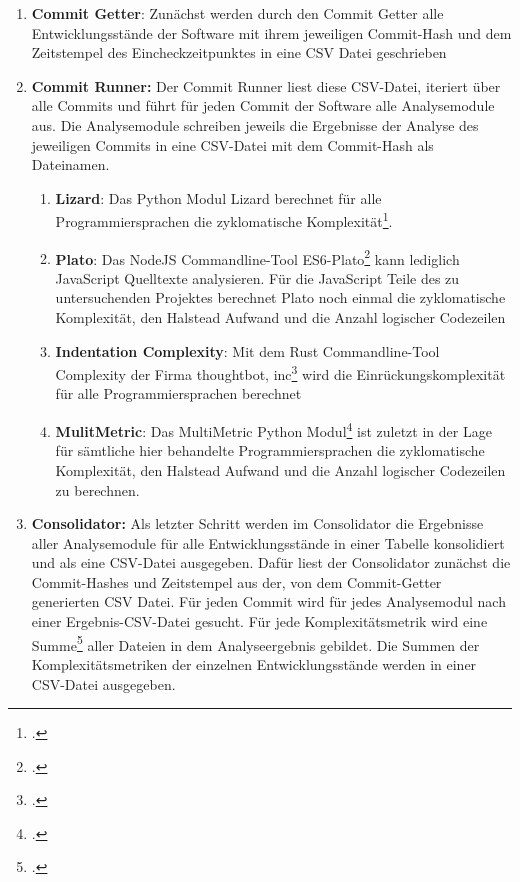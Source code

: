\begin{enumerate}
\def\labelenumi{\arabic{enumi}.}
\item
    \textbf{Commit Getter}: Zunächst werden durch den Commit Getter alle
    Entwicklungsstände der Software mit ihrem jeweiligen Commit-Hash und
    dem Zeitstempel des Eincheckzeitpunktes in eine CSV Datei geschrieben
\item
    \textbf{Commit Runner:} Der Commit Runner liest diese CSV-Datei,
    iteriert über alle Commits und führt für jeden Commit der Software
    alle Analysemodule aus. Die Analysemodule schreiben jeweils die
    Ergebnisse der Analyse des jeweiligen Commits in eine CSV-Datei mit
    dem Commit-Hash als Dateinamen.

    \begin{enumerate}
    \def\labelenumii{\alph{enumii}.}
    \item
    \textbf{Lizard}: Das Python Modul Lizard berechnet für alle
    Programmiersprachen die zyklomatische Komplexität\footcite[Vgl. ][]{LizardPythonModule}.
    \item
    \textbf{Plato}: Das NodeJS Commandline-Tool ES6-Plato\footcite[Vgl. ][]{Es6platoLibMaster}
    kann lediglich JavaScript Quelltexte analysieren. Für die JavaScript
    Teile des zu untersuchenden Projektes berechnet Plato noch einmal
    die zyklomatische Komplexität, den Halstead Aufwand und die Anzahl
    logischer Codezeilen
    \item
    \textbf{Indentation Complexity}: Mit dem Rust Commandline-Tool
    Complexity der Firma thoughtbot, inc\footcite[Vgl. ][]{Complexity2022} wird
    die Einrückungskomplexität für alle Programmiersprachen berechnet
    \item
    \textbf{MulitMetric}: Das MultiMetric Python Modul\footcite[Vgl. ][]{weihmanMultimetric2021}
    ist zuletzt in der Lage für sämtliche hier behandelte
    Programmiersprachen die zyklomatische Komplexität, den Halstead
    Aufwand und die Anzahl logischer Codezeilen zu berechnen.
    \end{enumerate}
\item
    \textbf{Consolidator:} Als letzter Schritt werden im Consolidator die
    Ergebnisse aller Analysemodule für alle Entwicklungsstände in einer
    Tabelle konsolidiert und als eine CSV-Datei ausgegeben. Dafür liest
    der Consolidator zunächst die Commit-Hashes und Zeitstempel aus der,
    von dem Commit-Getter generierten CSV Datei. Für jeden Commit wird für
    jedes Analysemodul nach einer Ergebnis-CSV-Datei gesucht. Für jede
    Komplexitätsmetrik wird eine Summe\footcite[Vgl. ][]{(Hoffmann 2013:276)} aller
    Dateien in dem Analyseergebnis gebildet. Die Summen der
    Komplexitätsmetriken der einzelnen Entwicklungsstände werden in einer
    CSV-Datei ausgegeben.
\end{enumerate}

